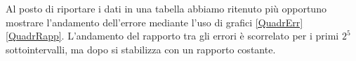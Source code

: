 
Al posto di riportare i dati in una tabella abbiamo ritenuto più opportuno mostrare l'andamento dell'errore mediante l'uso di grafici \ref{QuadrErr} \ref{QuadrRapp}.
L'andamento del rapporto tra gli errori è scorrelato per i primi $2^5$ sottointervalli, ma dopo si stabilizza con un rapporto costante.
